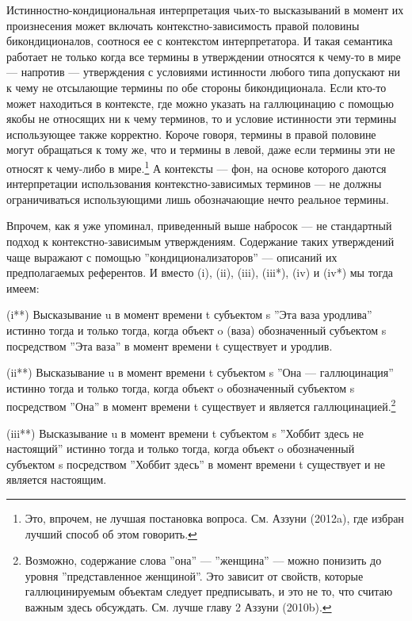 \documentclass[11pt]{book}
\begin{document}
Истинностно-кондициональная интерпретация чьих-то высказываний в момент их произнесения может включать контекстно-зависимость правой половины бикондиционалов, соотнося ее с контекстом интерпретатора. И такая семантика работает не только когда все термины в утверждении относятся к чему-то в мире --- напротив --- утверждения с условиями истинности любого типа допускают ни к чему не отсылающие термины по обе стороны бикондиционала. Если кто-то может находиться в контексте, где можно указать на галлюцинацию с помощью якобы не относящих ни к чему терминов, то и условие истинности эти термины использующее также корректно. Короче говоря, термины в правой половине могут обращаться к тому же, что и термины в левой, даже если термины эти не относят к чему-либо в мире.\footnote{Это, впрочем, не лучшая постановка вопроса. См. Аззуни (2012a), где избран лучший способ об этом говорить.} А контексты --- фон, на основе которого даются интерпретации использования контекстно-зависимых терминов --- не должны ограничиваться использующими лишь обозначающие нечто реальное термины.

Впрочем, как я уже упоминал, приведенный выше набросок --- не стандартный подход к контекстно-зависимым утверждениям. Содержание таких утверждений чаще выражают с помощью ''кондиционализаторов'' --- описаний их предполагаемых референтов. И вместо (i), (ii), (iii), (iii*), (iv) и (iv*) мы тогда имеем:

\smallskip

(i**) Высказывание u в момент времени t субъектом s ''Эта ваза уродлива'' истинно тогда и только тогда, когда объект o (ваза) обозначенный субъектом s посредством ''Эта ваза'' в момент времени t существует и уродлив.

(ii**) Высказывание u в момент времени t субъектом s ''Она --- галлюцинация'' истинно тогда и только тогда, когда объект o обозначенный субъектом s посредством ''Она'' в момент времени t существует и является галлюцинацией.\footnote{Возможно, содержание слова ''она'' --- ''женщина'' --- можно понизить до уровня ''представленное женщиной''. Это зависит от свойств, которые галлюцинируемым объектам следует предписывать, и это не то, что считаю важным здесь обсуждать. См. лучше главу 2 Аззуни (2010b).}

(iii**) Высказывание u в момент времени t субъектом s ''Хоббит здесь не настоящий'' истинно тогда и только тогда, когда объект o обозначенный субъектом s посредством ''Хоббит здесь'' в момент времени t существует и не является настоящим.
\end{document}
